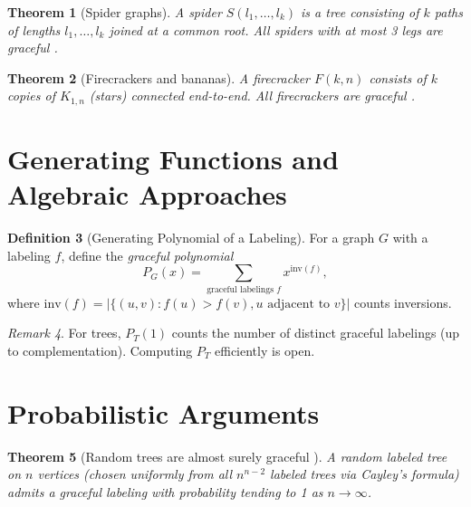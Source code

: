 \documentclass[12pt,a4paper]{amsart}
\newtheorem{theorem}{Theorem}[section]
\theoremstyle{definition}
\newtheorem{definition}[theorem]{Definition}
\theoremstyle{remark}
\newtheorem{remark}[theorem]{Remark}
\begin{document}
\begin{theorem}[Spider graphs]\label{thm:spiders}
A \emph{spider} $S(l_1, \ldots, l_k)$ is a tree consisting of $k$ paths of lengths
$l_1, \ldots, l_k$ joined at a common root. All spiders with at most 3 legs are
graceful \cite{Bahl2001}.
\end{theorem}

\begin{theorem}[Firecrackers and bananas]\label{thm:firecrackers}
A \emph{firecracker} $F(k,n)$ consists of $k$ copies of $K_{1,n}$ (stars) connected
end-to-end. All firecrackers are graceful \cite{Chen1999}.
\end{theorem}

\section{Generating Functions and Algebraic Approaches}\label{sec:algebraic}

\begin{definition}[Generating Polynomial of a Labeling]
For a graph $G$ with a labeling $f$, define the \emph{graceful polynomial}
\[
  P_G(x) = \sum_{\text{graceful labelings } f} x^{\text{inv}(f)},
\]
where $\text{inv}(f) = |\{(u,v) : f(u) > f(v), u \text{ adjacent to } v\}|$
counts inversions.
\end{definition}

\begin{remark}
For trees, $P_T(1)$ counts the number of distinct graceful labelings (up to
complementation). Computing $P_T$ efficiently is open.
\end{remark}

\section{Probabilistic Arguments}\label{sec:probabilistic}

\begin{theorem}[Random trees are almost surely graceful \cite{Alon1993}]
\label{thm:random_graceful}
A random labeled tree on $n$ vertices (chosen uniformly from all $n^{n-2}$
labeled trees via Cayley's formula) admits a graceful labeling with probability
tending to 1 as $n \to \infty$.
\end{theorem}
\end{document}
